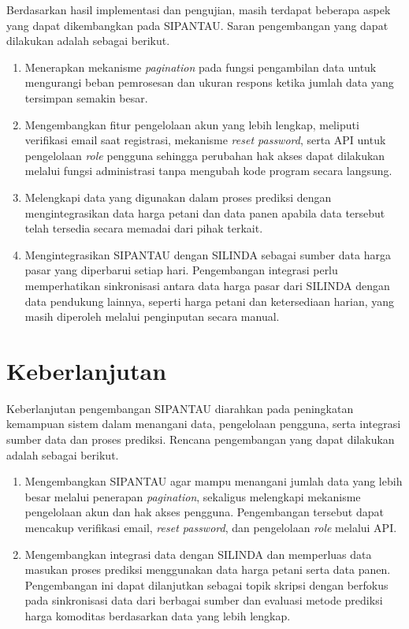 Berdasarkan hasil implementasi dan pengujian, masih terdapat beberapa aspek yang dapat dikembangkan pada SIPANTAU. Saran pengembangan yang dapat dilakukan adalah sebagai berikut.

\begin{enumerate}
    \item Menerapkan mekanisme \textit{pagination} pada fungsi pengambilan data untuk mengurangi beban pemrosesan dan ukuran respons ketika jumlah data yang tersimpan semakin besar.
    
    \item Mengembangkan fitur pengelolaan akun yang lebih lengkap, meliputi verifikasi email saat registrasi, mekanisme \textit{reset password}, serta API untuk pengelolaan \textit{role} pengguna sehingga perubahan hak akses dapat dilakukan melalui fungsi administrasi tanpa mengubah kode program secara langsung.
    
    \item Melengkapi data yang digunakan dalam proses prediksi dengan mengintegrasikan data harga petani dan data panen apabila data tersebut telah tersedia secara memadai dari pihak terkait.
    
    \item Mengintegrasikan SIPANTAU dengan SILINDA sebagai sumber data harga pasar yang diperbarui setiap hari. Pengembangan integrasi perlu memperhatikan sinkronisasi antara data harga pasar dari SILINDA dengan data pendukung lainnya, seperti harga petani dan ketersediaan harian, yang masih diperoleh melalui penginputan secara manual.
\end{enumerate}

\section{Keberlanjutan}

Keberlanjutan pengembangan SIPANTAU diarahkan pada peningkatan kemampuan sistem dalam menangani data, pengelolaan pengguna, serta integrasi sumber data dan proses prediksi. Rencana pengembangan yang dapat dilakukan adalah sebagai berikut.

\begin{enumerate}
    \item Mengembangkan SIPANTAU agar mampu menangani jumlah data yang lebih besar melalui penerapan \textit{pagination}, sekaligus melengkapi mekanisme pengelolaan akun dan hak akses pengguna. Pengembangan tersebut dapat mencakup verifikasi email, \textit{reset password}, dan pengelolaan \textit{role} melalui API.
    
    \item Mengembangkan integrasi data dengan SILINDA dan memperluas data masukan proses prediksi menggunakan data harga petani serta data panen. Pengembangan ini dapat dilanjutkan sebagai topik skripsi dengan berfokus pada sinkronisasi data dari berbagai sumber dan evaluasi metode prediksi harga komoditas berdasarkan data yang lebih lengkap.
\end{enumerate}